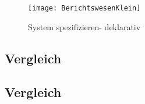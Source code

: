 \begin{figure}[!htbp]
\begin{center}
  \texttt{[image: BerichtswesenKlein]} %
  \caption{System spezifizieren- deklarativ}
  \label{fig:BerichtswesenKlein}
\end{center}
\end{figure}
\subsection{Vergleich}

\subsection{Vergleich}









